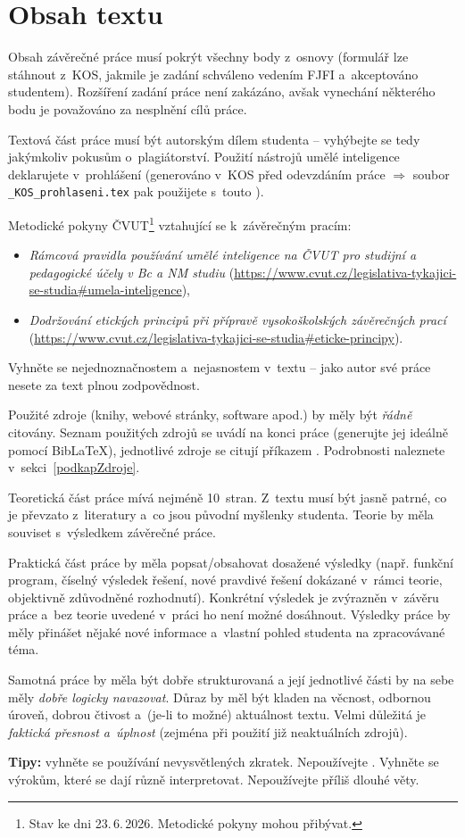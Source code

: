 \section{Obsah textu} \label{obsah} 
Obsah závěrečné práce musí pokrýt všechny body z~osnovy (formulář  lze stáhnout z~KOS, jakmile je zadání schváleno vedením FJFI a~akceptováno studentem). Rozšíření zadání práce není zakázáno, avšak vynechání některého bodu je považováno za nesplnění cílů práce.
\par 
Textová část práce musí být {\color{red} autorským dílem studenta} -- vyhýbejte se tedy jakýmkoliv pokusům o~plagiátorství. Použití nástrojů umělé inteligence deklarujete v~prohlášení (generováno v~KOS před odevzdáním práce $\Rightarrow$ soubor \texttt{\_KOS\_prohlaseni.tex} pak použijete s~touto ). \par
Metodické pokyny ČVUT\footnote{Stav ke dni 23.\,6.\,2026. Metodické pokyny mohou přibývat.} vztahující se k~závěrečným pracím:\label{metodPokyny}
\begin{itemize}
    \item \textit{Rámcová pravidla používání umělé inteligence na ČVUT pro studijní a pedagogické účely v Bc a NM studiu} (\url{https://www.cvut.cz/legislativa-tykajici-se-studia#umela-inteligence}),
    \item \textit{Dodržování etických principů při přípravě vysokoškolských závěrečných prací} (\url{https://www.cvut.cz/legislativa-tykajici-se-studia#eticke-principy}).
\end{itemize} Vyhněte se nejednoznačnostem a~nejasnostem v~textu -- jako autor své práce nesete za text plnou zodpovědnost.
\par
Použité zdroje (knihy, webové stránky, software apod.) by měly být \textit{řádně} citovány. Seznam použitých zdrojů se uvádí na konci práce (generujte jej ideálně pomocí BibLaTeX), jednotlivé zdroje se citují příkazem . Podrobnosti naleznete v~sekci~\ref{podkapZdroje}.
\par
Teoretická část práce mívá nejméně 10~stran. Z~textu musí být jasně patrné, co je převzato z~literatury a~co jsou původní myšlenky studenta. Teorie by měla souviset s~výsledkem závěrečné práce.
\par 
Praktická část práce by měla popsat/obsahovat dosažené výsledky (např. funkční program, číselný výsledek řešení, nové pravdivé řešení dokázané v~rámci teorie, objektivně zdůvodněné rozhodnutí). Konkrétní výsledek je zvýrazněn v~závěru práce a~bez teorie uvedené v~práci ho není možné dosáhnout. Výsledky práce by měly přinášet nějaké nové informace a~vlastní pohled studenta na zpracovávané téma.
\par
Samotná práce by měla být dobře strukturovaná a její jednotlivé části by na sebe měly {\em dobře logicky navazovat}. Důraz by měl být kladen na věcnost, odbornou úroveň, dobrou čtivost a~(je-li to možné) aktuálnost textu. Velmi důležitá je {\em faktická přesnost a~úplnost} (zejména při použití již neaktuálních zdrojů).
\par
{\bf Tipy:} vyhněte se používání nevysvětlených zkratek. Nepoužívejte . Vyhněte se výrokům, které se dají různě interpretovat. Nepoužívejte příliš dlouhé věty. 



